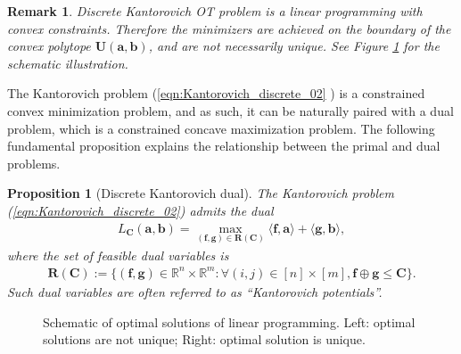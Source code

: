 \documentclass[11pt]{book}
\newtheorem{proposition}[theorem]{Proposition}
\newtheorem{remark}[theorem]{Remark}
\begin{document}
\begin{remark}
Discrete Kantorovich OT problem is a linear programming with convex constraints. Therefore the minimizers are achieved on the boundary of the convex polytope \( \mathbf{U}(\mathbf{a}, \mathbf{b})  \), and are not necessarily unique. See Figure \ref{fig:Linear_programming} for the schematic illustration.
\end{remark}

The Kantorovich problem (\ref{eqn:Kantorovich_discrete_02} ) is a constrained convex minimization problem, and as such, it can be naturally paired with a dual problem, which is a constrained concave maximization problem. The following fundamental proposition explains the relationship between the primal and dual problems.

\begin{proposition}[Discrete Kantorovich dual]
The Kantorovich problem (\ref{eqn:Kantorovich_discrete_02}) admits the dual
\begin{align}
L_{\mathbf{C}}(\mathbf{a}, \mathbf{b}) = \max_{(\mathbf{f}, \mathbf{g}) \in \mathbf{R}(\mathbf{C})} \langle \mathbf{f}, \mathbf{a} \rangle + \langle \mathbf{g}, \mathbf{b} \rangle,
\end{align}
where the set of feasible dual variables is
\begin{align}
\mathbf{R}(\mathbf{C}) := \{(\mathbf{f}, \mathbf{g}) \in \mathbb{R}^n \times \mathbb{R}^m : \forall (i, j) \in [n] \times [m], \mathbf{f} \oplus \mathbf{g} \leq \mathbf{C} \}. 
\end{align}
Such dual variables are often referred to as ``Kantorovich potentials''.
\end{proposition}


\begin{figure}[t]
\center
{}

\caption{Schematic of optimal solutions of linear programming. Left: optimal solutions are not unique; Right: optimal solution is unique.} \label{fig:Linear_programming} 

\end{figure}
\end{document}

